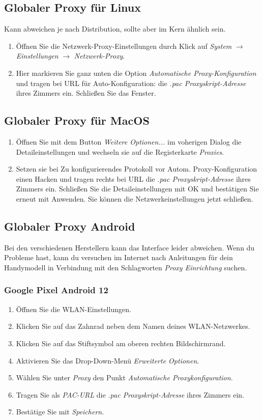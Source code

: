 \documentclass[a4paper,12pt]{scrartcl}
\begin{document}
\subsection*{Globaler Proxy für Linux}
Kann abweichen je nach Distribution, sollte aber im Kern ähnlich sein.
\begin{enumerate}
	\item Öffnen Sie die Netzwerk-Proxy-Einstellungen durch Klick auf \emph{System} $\rightarrow$ \emph{Einstellungen} $\rightarrow$ \emph{Netzwerk-Proxy}.
	\item Hier markieren Sie ganz unten die Option \emph{Automatische Proxy-Konfiguration} und tragen bei URL für Auto-Konfiguration: die \textit{.pac Proxyskript-Adresse} ihres Zimmers ein. Schließen Sie das Fenster. 
\end{enumerate}

\subsection*{Globaler Proxy für MacOS}
\begin{enumerate}
	\item Öffnen Sie mit dem Button \emph{Weitere Optionen...} im voherigen Dialog die Detaileinstellungen und wechseln sie auf die Registerkarte \emph{Proxies}.
	\item Setzen sie bei Zu konfigurierendes Protokoll vor Autom. Proxy-Konfiguration einen Hacken und tragen rechts bei URL die \textit{.pac Proxyskript-Adresse} ihres Zimmers ein. Schließen Sie die Detaileinstellungen mit OK und bestätigen Sie erneut mit Anwenden. Sie können die Netzwerkeinstellungen jetzt schließen.
\end{enumerate}

\subsection*{Globaler Proxy Android}
Bei den verschiedenen Herstellern kann das Interface leider abweichen.
Wenn du Probleme hast, kann du versuchen im Internet nach Anleitungen für dein Handymodell in Verbindung mit den Schlagworten \textit{Proxy Einrichtung} suchen.

\subsubsection*{Google Pixel Android 12}
\begin{enumerate}
	\item Öffnen Sie die WLAN-Einstellungen.
	\item Klicken Sie auf das Zahnrad neben dem Namen deines WLAN-Netzwerkes.
	\item Klicken Sie auf das Stiftsymbol am oberen rechten Bildschirmrand.
	\item Aktivieren Sie das Drop-Down-Menü \textit{Erweiterte Optionen}.
	\item Wählen Sie unter \textit{Proxy} den Punkt \textit{Automatische Proxykonfiguration}.
	\item Tragen Sie als \textit{PAC-URL} die \textit{.pac Proxyskript-Adresse} ihres Zimmers ein.
	\item Bestätige Sie mit \textit{Speichern}.
\end{enumerate}
\end{document}
